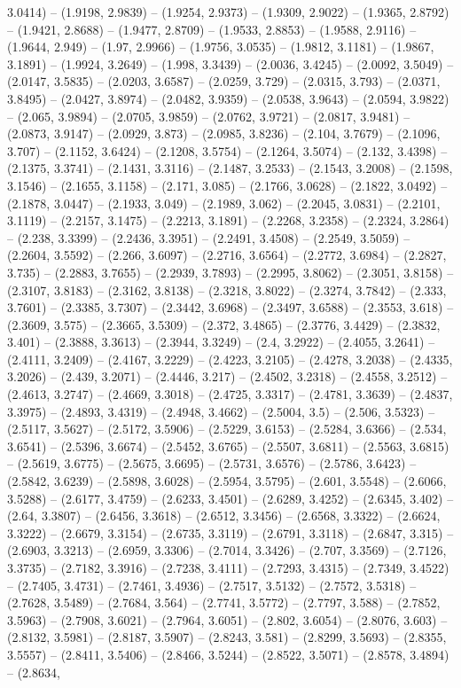 3.0414) -- (1.9198, 2.9839) -- (1.9254, 2.9373) -- (1.9309, 2.9022) -- (1.9365, 2.8792) -- (1.9421, 2.8688) -- (1.9477, 2.8709) -- (1.9533, 2.8853) -- (1.9588, 2.9116) -- (1.9644, 2.949) -- (1.97, 2.9966) -- (1.9756, 3.0535) -- (1.9812, 3.1181) -- (1.9867, 3.1891) -- (1.9924, 3.2649) -- (1.998, 3.3439) -- (2.0036, 3.4245) -- (2.0092, 3.5049) -- (2.0147, 3.5835) -- (2.0203, 3.6587) -- (2.0259, 3.729) -- (2.0315, 3.793) -- (2.0371, 3.8495) -- (2.0427, 3.8974) -- (2.0482, 3.9359) -- (2.0538, 3.9643) -- (2.0594, 3.9822) -- (2.065, 3.9894) -- (2.0705, 3.9859) -- (2.0762, 3.9721) -- (2.0817, 3.9481) -- (2.0873, 3.9147) -- (2.0929, 3.873) -- (2.0985, 3.8236) -- (2.104, 3.7679) -- (2.1096, 3.707) -- (2.1152, 3.6424) -- (2.1208, 3.5754) -- (2.1264, 3.5074) -- (2.132, 3.4398) -- (2.1375, 3.3741) -- (2.1431, 3.3116) -- (2.1487, 3.2533) -- (2.1543, 3.2008) -- (2.1598, 3.1546) -- (2.1655, 3.1158) -- (2.171, 3.085) -- (2.1766, 3.0628) -- (2.1822, 3.0492) -- (2.1878, 3.0447) -- (2.1933, 3.049) -- (2.1989, 3.062) -- (2.2045, 3.0831) -- (2.2101, 3.1119) -- (2.2157, 3.1475) -- (2.2213, 3.1891) -- (2.2268, 3.2358) -- (2.2324, 3.2864) -- (2.238, 3.3399) -- (2.2436, 3.3951) -- (2.2491, 3.4508) -- (2.2549, 3.5059) -- (2.2604, 3.5592) -- (2.266, 3.6097) -- (2.2716, 3.6564) -- (2.2772, 3.6984) -- (2.2827, 3.735) -- (2.2883, 3.7655) -- (2.2939, 3.7893) -- (2.2995, 3.8062) -- (2.3051, 3.8158) -- (2.3107, 3.8183) -- (2.3162, 3.8138) -- (2.3218, 3.8022) -- (2.3274, 3.7842) -- (2.333, 3.7601) -- (2.3385, 3.7307) -- (2.3442, 3.6968) -- (2.3497, 3.6588) -- (2.3553, 3.618) -- (2.3609, 3.575) -- (2.3665, 3.5309) -- (2.372, 3.4865) -- (2.3776, 3.4429) -- (2.3832, 3.401) -- (2.3888, 3.3613) -- (2.3944, 3.3249) -- (2.4, 3.2922) -- (2.4055, 3.2641) -- (2.4111, 3.2409) -- (2.4167, 3.2229) -- (2.4223, 3.2105) -- (2.4278, 3.2038) -- (2.4335, 3.2026) -- (2.439, 3.2071) -- (2.4446, 3.217) -- (2.4502, 3.2318) -- (2.4558, 3.2512) -- (2.4613, 3.2747) -- (2.4669, 3.3018) -- (2.4725, 3.3317) -- (2.4781, 3.3639) -- (2.4837, 3.3975) -- (2.4893, 3.4319) -- (2.4948, 3.4662) -- (2.5004, 3.5) -- (2.506, 3.5323) -- (2.5117, 3.5627) -- (2.5172, 3.5906) -- (2.5229, 3.6153) -- (2.5284, 3.6366) -- (2.534, 3.6541) -- (2.5396, 3.6674) -- (2.5452, 3.6765) -- (2.5507, 3.6811) -- (2.5563, 3.6815) -- (2.5619, 3.6775) -- (2.5675, 3.6695) -- (2.5731, 3.6576) -- (2.5786, 3.6423) -- (2.5842, 3.6239) -- (2.5898, 3.6028) -- (2.5954, 3.5795) -- (2.601, 3.5548) -- (2.6066, 3.5288) -- (2.6177, 3.4759) -- (2.6233, 3.4501) -- (2.6289, 3.4252) -- (2.6345, 3.402) -- (2.64, 3.3807) -- (2.6456, 3.3618) -- (2.6512, 3.3456) -- (2.6568, 3.3322) -- (2.6624, 3.3222) -- (2.6679, 3.3154) -- (2.6735, 3.3119) -- (2.6791, 3.3118) -- (2.6847, 3.315) -- (2.6903, 3.3213) -- (2.6959, 3.3306) -- (2.7014, 3.3426) -- (2.707, 3.3569) -- (2.7126, 3.3735) -- (2.7182, 3.3916) -- (2.7238, 3.4111) -- (2.7293, 3.4315) -- (2.7349, 3.4522) -- (2.7405, 3.4731) -- (2.7461, 3.4936) -- (2.7517, 3.5132) -- (2.7572, 3.5318) -- (2.7628, 3.5489) -- (2.7684, 3.564) -- (2.7741, 3.5772) -- (2.7797, 3.588) -- (2.7852, 3.5963) -- (2.7908, 3.6021) -- (2.7964, 3.6051) -- (2.802, 3.6054) -- (2.8076, 3.603) -- (2.8132, 3.5981) -- (2.8187, 3.5907) -- (2.8243, 3.581) -- (2.8299, 3.5693) -- (2.8355, 3.5557) -- (2.8411, 3.5406) -- (2.8466, 3.5244) -- (2.8522, 3.5071) -- (2.8578, 3.4894) -- (2.8634, 